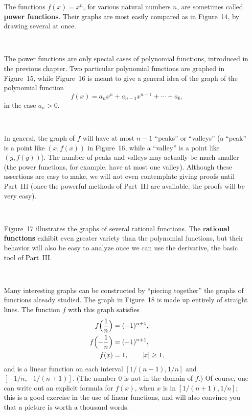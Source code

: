 The functions $f(x)=x^n$, for various natural numbers $n$, are sometimes called
\textbf{power functions}. Their graphs are most easily compared as in
Figure~14, by drawing several at once.

\begin{center}
\\[0.6em]
\end{center}

The power functions are only special cases of polynomial functions, introduced
in the previous chapter. Two particular polynomial functions are graphed in
Figure~15, while Figure~16 is meant to give a general idea of the graph of the
polynomial function
\[
f(x)=a_n x^n+a_{n-1}x^{n-1}+\cdots+a_0,
\]
in the case $a_n>0$.

\begin{center}
\\[0.6em]
\end{center}

In general, the graph of $f$ will have at most $n-1$ ``peaks'' or ``valleys''
(a ``peak'' is a point like $(x,f(x))$ in Figure~16, while a ``valley'' is a
point like $(y,f(y))$). The number of peaks and valleys may actually be much
smaller (the power functions, for example, have at most one valley). Although
these assertions are easy to make, we will not even contemplate giving proofs
until Part~III (once the powerful methods of Part~III are available, the proofs
will be very easy).

\begin{center}
\\[0.6em]
\end{center}

Figure~17 illustrates the graphs of several rational functions. The
\textbf{rational functions} exhibit even greater variety than the polynomial
functions, but their behavior will also be easy to analyze once we can use the
derivative, the basic tool of Part~III.

\begin{center}
\\[0.6em]
\end{center}

Many interesting graphs can be constructed by ``piecing together'' the graphs
of functions already studied. The graph in Figure~18 is made up entirely of
straight lines. The function $f$ with this graph satisfies
\begin{align*}
f\Bigl(\frac1n\Bigr)&=(-1)^{n+1},\\
f\Bigl(-\frac1n\Bigr)&=(-1)^{n+1},\\
f(x)&=1, \qquad \lvert x\rvert\geq 1,
\end{align*}
and is a linear function on each interval $[1/(n+1),1/n]$ and
$[-1/n,-1/(n+1)]$. (The number $0$ is not in the domain of $f$.) Of course, one
can write out an explicit formula for $f(x)$, when $x$ is in
$[1/(n+1),1/n]$; this is a good exercise in the use of linear functions, and
will also convince you that a picture is worth a thousand words.

